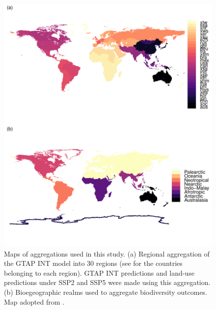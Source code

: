 \documentclass[titlesmallcaps,copyrightpage]{uomthesis}\usepackage[]{graphicx}\usepackage[]{color}
\begin{document}
\begin{figure}[htb]
  \centering
    \includegraphics[width=1\linewidth]{chapters/figures/chapter4/fig_regionmap.pdf} 
    \caption{Maps of aggregations used in this study. (a) Regional aggregation of the GTAP INT model into 30 regions (see  for the countries belonging to each region). GTAP INT predictions and land-use predictions under SSP2 and SSP5 were made using this aggregation. (b) Bioegeographic realms used to aggregate biodiversity outcomes. Map adopted from \citet{olson2001terrestrial}.}
    \label{ch4:fig_regionmap}
\end{figure}
\end{document}
